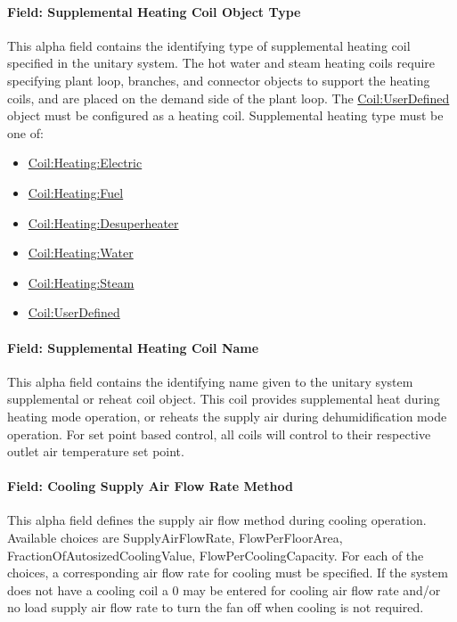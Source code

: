 \paragraph{Field: Supplemental Heating Coil Object Type}\label{field-supplemental-heating-coil-object-type}

This alpha field contains the identifying type of supplemental heating coil specified in the unitary system. The hot water and steam heating coils require specifying plant loop, branches, and connector objects to support the heating coils, and are placed on the demand side of the plant loop. The \hyperref[coiluserdefined]{Coil:UserDefined} object must be configured as a heating coil. Supplemental heating type must be one of:

\begin{itemize}
\item
  \hyperref[coilheatingelectric]{Coil:Heating:Electric}
\item
  \hyperref[coilheatinggas-000]{Coil:Heating:Fuel}
\item
  \hyperref[coilheatingdesuperheater]{Coil:Heating:Desuperheater}
\item
  \hyperref[coilheatingwater]{Coil:Heating:Water}
\item
  \hyperref[coilheatingsteam]{Coil:Heating:Steam}
\item
  \hyperref[coiluserdefined]{Coil:UserDefined}
\end{itemize}

\paragraph{Field: Supplemental Heating Coil Name}\label{field-supplemental-heating-coil-name}

This alpha field contains the identifying name given to the unitary system supplemental or reheat coil object. This coil provides supplemental heat during heating mode operation, or reheats the supply air during dehumidification mode operation. For set point based control, all coils will control to their respective outlet air temperature set point.

\paragraph{Field: Cooling Supply Air Flow Rate Method}\label{field-cooling-supply-air-flow-rate-method-000}

This alpha field defines the supply air flow method during cooling operation. Available choices are SupplyAirFlowRate, FlowPerFloorArea, FractionOfAutosizedCoolingValue, FlowPerCoolingCapacity. For each of the choices, a corresponding air flow rate for cooling must be specified. If the system does not have a cooling coil a 0 may be entered for cooling air flow rate and/or no load supply air flow rate to turn the fan off when cooling is not required.

